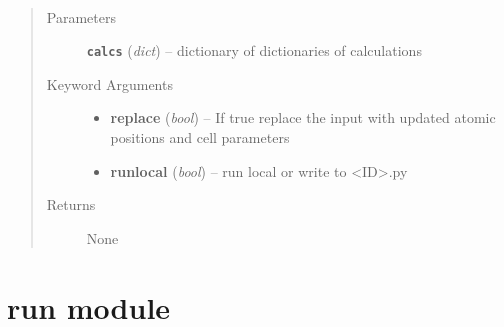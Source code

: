\documentclass[letterpaper,10pt,english]{sphinxmanual}
\begin{document}

\begin{fulllineitems}
\label{retr:retr.writeInputFromOutput}~\begin{quote}\begin{description}
\item[{Parameters}] \leavevmode
\textbf{\texttt{calcs}} (\emph{dict}) -- dictionary of dictionaries of calculations

\item[{Keyword Arguments}] \leavevmode\begin{itemize}
\item {} 
\textbf{replace} (\emph{bool}) --
If true replace the input with updated atomic positions and cell parameters

\item {} 
\textbf{runlocal} (\emph{bool}) --
run local or write to \textless{}ID\textgreater{}.py

\end{itemize}

\item[{Returns}] \leavevmode
None

\end{description}\end{quote}

\end{fulllineitems}



\chapter{run module}
\label{run:module-run}\label{run::doc}\label{run:run-module}
\end{document}
